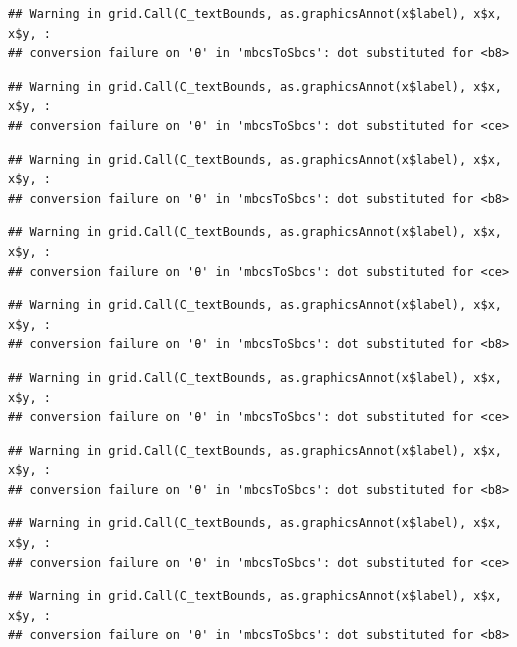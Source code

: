 \documentclass[]{book}
\theoremstyle{definition}
\theoremstyle{definition}
\theoremstyle{definition}
\theoremstyle{remark}
\begin{document}
\begin{verbatim}
## Warning in grid.Call(C_textBounds, as.graphicsAnnot(x$label), x$x, x$y, :
## conversion failure on 'θ' in 'mbcsToSbcs': dot substituted for <b8>
\end{verbatim}

\begin{verbatim}
## Warning in grid.Call(C_textBounds, as.graphicsAnnot(x$label), x$x, x$y, :
## conversion failure on 'θ' in 'mbcsToSbcs': dot substituted for <ce>
\end{verbatim}

\begin{verbatim}
## Warning in grid.Call(C_textBounds, as.graphicsAnnot(x$label), x$x, x$y, :
## conversion failure on 'θ' in 'mbcsToSbcs': dot substituted for <b8>
\end{verbatim}

\begin{verbatim}
## Warning in grid.Call(C_textBounds, as.graphicsAnnot(x$label), x$x, x$y, :
## conversion failure on 'θ' in 'mbcsToSbcs': dot substituted for <ce>
\end{verbatim}

\begin{verbatim}
## Warning in grid.Call(C_textBounds, as.graphicsAnnot(x$label), x$x, x$y, :
## conversion failure on 'θ' in 'mbcsToSbcs': dot substituted for <b8>
\end{verbatim}

\begin{verbatim}
## Warning in grid.Call(C_textBounds, as.graphicsAnnot(x$label), x$x, x$y, :
## conversion failure on 'θ' in 'mbcsToSbcs': dot substituted for <ce>
\end{verbatim}

\begin{verbatim}
## Warning in grid.Call(C_textBounds, as.graphicsAnnot(x$label), x$x, x$y, :
## conversion failure on 'θ' in 'mbcsToSbcs': dot substituted for <b8>
\end{verbatim}

\begin{verbatim}
## Warning in grid.Call(C_textBounds, as.graphicsAnnot(x$label), x$x, x$y, :
## conversion failure on 'θ' in 'mbcsToSbcs': dot substituted for <ce>
\end{verbatim}

\begin{verbatim}
## Warning in grid.Call(C_textBounds, as.graphicsAnnot(x$label), x$x, x$y, :
## conversion failure on 'θ' in 'mbcsToSbcs': dot substituted for <b8>
\end{verbatim}
\end{document}

